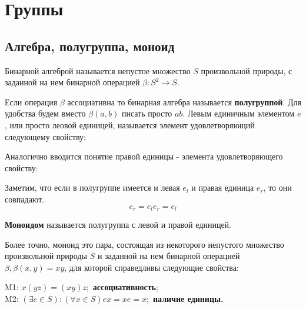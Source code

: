 

\maketitle
\tableofcontents
\break
\newpage

\newpage

\chapter{Группы}
\section{Алгебра, полугруппа, моноид}
{

\begin{Def}

Бинарной алгеброй называется непустое множество $S$ произвольной природы, с заданной на нем бинарной операцией $\beta : S^2 \rightarrow S $.
\end{Def}
Если операция $\beta$ ассоциативна то бинарная алгебра называется \textbf{полугруппой}. Для удобства будем вместо $\beta(a,b)$ писать просто $ab$. Левым единичным элементом \textbf{$e$}, или просто  леовой единицей, называется элемент удовлетворяющий следующему свойству: 
 \begin{center}
  \end{center} 
Аналогично вводится понятие правой единицы - элемента удовлетворяющего свойству: 
    \begin{center}
  \end{center}
Заметим, что если в полугруппе имеется и левая $e_l$ и правая единица $e_r$, то они совпадают.
$$ e_r=e_l e_r=e_l  $$

\begin{Def}
\textbf{Моноидом} называется полугруппа с левой и правой единицей.\end{Def}
Более точно, моноид это пара, состоящая из некоторого непустого множество произвольной природы $S$ и  заданной на нем бинарной операцией $\beta, \beta(x,y)=xy$, для которой справедливы следующие свойства:
\begin{center}
M1: $x(yz)=(xy)z;$ \textbf{ассоциативность};\\
M2: $(\exists e \in S):(\forall x \in S)  ex=xe=x;$  \textbf{наличие единицы.}
\end{center}
}
